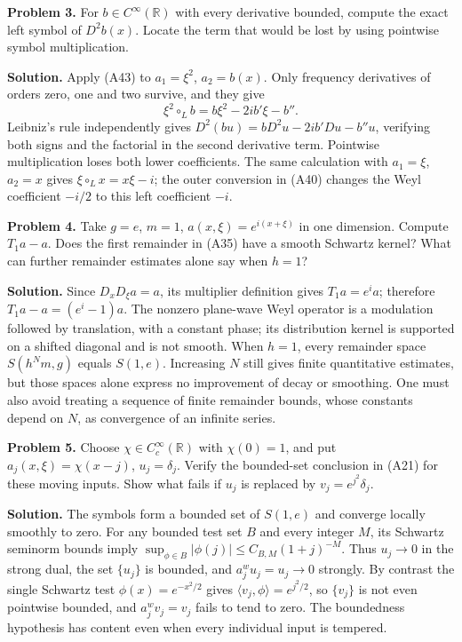 \documentclass[
  11pt,
]{article}
\begin{document}
\textbf{Problem 3.} For \(b\in C^\infty(\mathbb R)\) with every
derivative bounded, compute the exact left symbol of \(D^2b(x)\). Locate
the term that would be lost by using pointwise symbol multiplication.

\textbf{Solution.} Apply (A43) to \(a_1=\xi^2\), \(a_2=b(x)\). Only
frequency derivatives of orders zero, one and two survive, and they give
\[
\xi^2\circ_L b=b\xi^2-2ib'\xi-b''.
\tag{A50}
\] Leibniz's rule independently gives \(D^2(bu)=bD^2u-2ib'Du-b''u\),
verifying both signs and the factorial in the second derivative term.
Pointwise multiplication loses both lower coefficients. The same
calculation with \(a_1=\xi\), \(a_2=x\) gives \(\xi\circ_Lx=x\xi-i\);
the outer conversion in (A40) changes the Weyl coefficient \(-i/2\) to
this left coefficient \(-i\).

\textbf{Problem 4.} Take \(g=e\), \(m=1\), \(a(x,\xi)=e^{i(x+\xi)}\) in
one dimension. Compute \(T_1a-a\). Does the first remainder in (A35)
have a smooth Schwartz kernel? What can further remainder estimates
alone say when \(h=1\)?

\textbf{Solution.} Since \(D_xD_\xi a=a\), its multiplier definition
gives \(T_1a=e^i a\); therefore \(T_1a-a=(e^i-1)a\). The nonzero
plane-wave Weyl operator is a modulation followed by translation, with a
constant phase; its distribution kernel is supported on a shifted
diagonal and is not smooth. When \(h=1\), every remainder space
\(S(h^Nm,g)\) equals \(S(1,e)\). Increasing \(N\) still gives finite
quantitative estimates, but those spaces alone express no improvement of
decay or smoothing. One must also avoid treating a sequence of finite
remainder bounds, whose constants depend on \(N\), as convergence of an
infinite series.

\textbf{Problem 5.} Choose \(\chi\in C_c^\infty(\mathbb R)\) with
\(\chi(0)=1\), and put \(a_j(x,\xi)=\chi(x-j)\), \(u_j=\delta_j\).
Verify the bounded-set conclusion in (A21) for these moving inputs. Show
what fails if \(u_j\) is replaced by \(v_j=e^{j^2}\delta_j\).

\textbf{Solution.} The symbols form a bounded set of \(S(1,e)\) and
converge locally smoothly to zero. For any bounded test set \(B\) and
every integer \(M\), its Schwartz seminorm bounds imply
\(\sup_{\phi\in B}|\phi(j)|\le C_{B,M}(1+j)^{-M}\). Thus \(u_j\to0\) in
the strong dual, the set \(\{u_j\}\) is bounded, and
\(a_j^wu_j=u_j\to0\) strongly. By contrast the single Schwartz test
\(\phi(x)=e^{-x^2/2}\) gives \(\langle v_j,\phi\rangle=e^{j^2/2}\), so
\(\{v_j\}\) is not even pointwise bounded, and \(a_j^wv_j=v_j\) fails to
tend to zero. The boundedness hypothesis has content even when every
individual input is tempered.
\end{document}
